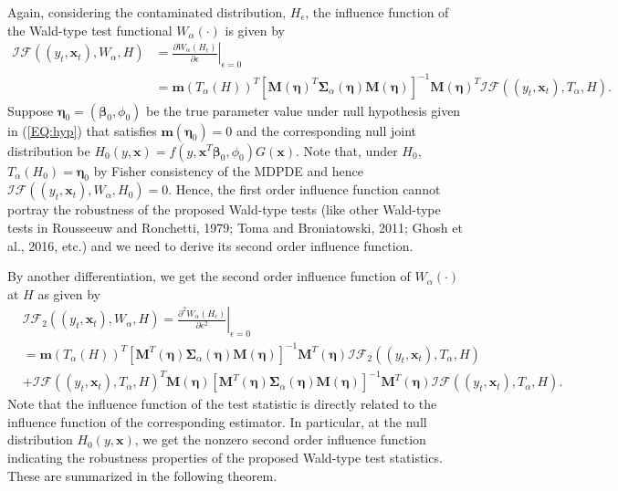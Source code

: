 \documentclass[a4paper]{article}%
\begin{document}
Again, considering the contaminated distribution, $H_{\epsilon}$, the
influence function of the Wald-type test functional $W_{\alpha}(\cdot)$ is
given by
\begin{align}
\mathcal{IF}((y_{t},\boldsymbol{x}_{t}),W_{\alpha},H)  &  = \left.
\frac{\partial W_{\alpha}(H_{\epsilon})}{\partial\epsilon}\right\vert
_{\epsilon=0}\nonumber\\
&  = \boldsymbol{m}\left(  T_{\alpha}(H)\right)  ^{T} \left[  \boldsymbol{M}%
\left(  \boldsymbol{\eta}\right)  ^{T}\boldsymbol{\Sigma}_{\alpha}\left(
\boldsymbol{\eta}\right)  \boldsymbol{M}\left(  \boldsymbol{\eta}\right)
\right]  ^{-1} \boldsymbol{M}\left(  \boldsymbol{\eta}\right)  ^{T}%
\mathcal{IF}((y_{t},\boldsymbol{x}_{t}),T_{\alpha},H).\nonumber
\end{align}
Suppose $\boldsymbol{\eta}_{0} = (\boldsymbol{\beta}_{0}, \phi_{0})$ be the
true parameter value under null hypothesis given in (\ref{EQ:hyp}) that
satisfies $\boldsymbol{m}(\boldsymbol{\eta}_{0}) = 0$ and the corresponding
null joint distribution be $H_{0}(y,\boldsymbol{x})=f(y,\boldsymbol{x}%
^{T}\boldsymbol{\beta}_{0}, \phi_{0})G(\boldsymbol{x})$. Note that, under
$H_{0}$, $T_{\alpha}(H_{0}) = \boldsymbol{\eta}_{0}$ by Fisher consistency of
the MDPDE and hence $\mathcal{IF}((y_{t},\boldsymbol{x}_{t}),W_{\alpha}%
,H_{0})=0$. Hence, the first order influence function cannot portray the
robustness of the proposed Wald-type tests (like other Wald-type tests in
Rousseeuw and Ronchetti, 1979; Toma and Broniatowski, 2011; Ghosh et al., 2016,
etc.) and we need to derive its second order influence function.

By another differentiation, we get the second order influence function of
$W_{\alpha}(\cdot)$ at $H$ as given by
\begin{align}
&  \mathcal{IF}_{2}((y_{t},\boldsymbol{x}_{t}),W_{\alpha},H) =\left.
\frac{\partial^{2} W_{\alpha}(H_{\epsilon})}{\partial\epsilon^{2}}\right\vert
_{\epsilon=0}\nonumber\\
&  = \boldsymbol{m}\left(  T_{\alpha}(H)\right)  ^{T} \left[  \boldsymbol{M}%
^{T}\left(  \boldsymbol{\eta}\right)  \boldsymbol{\Sigma}_{\alpha}\left(
\boldsymbol{\eta}\right)  \boldsymbol{M}\left(  \boldsymbol{\eta}\right)
\right]  ^{-1} \boldsymbol{M}^{T}\left(  \boldsymbol{\eta}\right)
\mathcal{IF}_{2}((y_{t},\boldsymbol{x}_{t}),T_{\alpha},H)\nonumber\\
&  + \mathcal{IF}((y_{t},\boldsymbol{x}_{t}),T_{\alpha},H)^{T}\boldsymbol{M}%
\left(  \boldsymbol{\eta}\right)  \left[  \boldsymbol{M}^{T}\left(
\boldsymbol{\eta}\right) \boldsymbol{\Sigma}_{\alpha}\left(  \boldsymbol{\eta
}\right)  \boldsymbol{M}\left(  \boldsymbol{\eta}\right)  \right]
^{-1}\boldsymbol{M}^{T}\left(  \boldsymbol{\eta}\right)  \mathcal{IF}%
((y_{t},\boldsymbol{x}_{t}),T_{\alpha},H).\nonumber
\end{align}
Note that the influence function of the test statistic is directly related to the influence function of the corresponding estimator. 
In particular, at the null distribution $H_{0}(y,\boldsymbol{x})$, we get the
nonzero second order influence function indicating the robustness properties
of the proposed Wald-type test statistics. These are summarized in the
following theorem.
\end{document}
